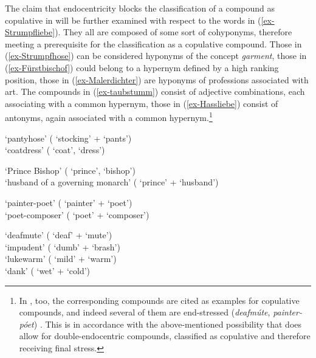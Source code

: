 \documentclass[output=paper
 ,nobabel
 ,draftmode
 ,colorlinks, citecolor=brown
]{langscibook}
\begin{document}
The claim that endocentricity blocks the classification of a compound as copulative in  will be further examined with respect to the words in (\ref{ex-Strumpfliebe}). They all are composed of some sort of cohyponyms, therefore meeting a prerequisite for the classification as a copulative compound.
Those in (\ref{ex-Strumpfhose}) can be considered hyponyms of the concept \emph{garment}, those in
(\ref{ex-Fürstbischof}) could belong to a hypernym defined by a high ranking position, those in
(\ref{ex-Malerdichter}) are hyponyms of professions associated with art. The compounds in
(\ref{ex-taubstumm}) consist of adjective combinations, each associating with a common hypernym,
those in (\ref{ex-Hassliebe}) consist of antonyms, again associated with a common
hypernym.\footnote{In , too, the corresponding compounds are cited as examples for copulative
  compounds, and indeed several of them are end-stressed (\eg \emph{deafmúte}, \emph{painter-póet})
  \citep[61]{Olsen2000}. This is in accordance with the above-mentioned possibility that 
  does allow for double-endocentric compounds, classified as copulative and therefore receiving
  final stress.}

\eal\label{ex-Strumpfliebe}
\ex\label{ex-Strumpfhose}
 `pantyhose' ( `stocking' +  `pants') \\ 
 `coatdress' ( `coat',  `dress')

\ex\label{ex-Fürstbischof}
 `Prince Bishop' ( `prince',  `bishop') \\
 `husband of a governing monarch' ( `prince' +  `husband')

\ex\label{ex-Malerdichter}
 `painter-poet' ( `painter' +  `poet') \\
 `poet-composer' ( `poet' +  `composer')

\ex\label{ex-taubstumm}
 `deafmute' ( `deaf' +  `mute') \\
 `impudent' ( `dumb' +  `brash') \\
 `lukewarm' ( `mild' +  `warm') \\
 `dank' ( `wet' +  `cold') \\
\end{document}
